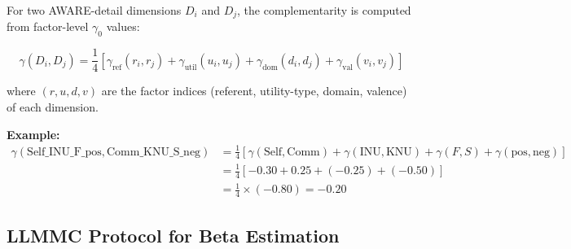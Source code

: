 \begin{tcolorbox}[colback=green!5!white, colframe=green!75!black,
    title=\textbf{EIT-EMP-1-A1: Detail Gamma Computation}]

For two AWARE-detail dimensions $D_i$ and $D_j$, the complementarity is computed from factor-level $\gamma_0$ values:

\begin{equation}
\gamma(D_i, D_j) = \frac{1}{4} \left[ \gamma_{\text{ref}}(r_i, r_j) + \gamma_{\text{util}}(u_i, u_j) + \gamma_{\text{dom}}(d_i, d_j) + \gamma_{\text{val}}(v_i, v_j) \right]
\end{equation}

where $(r, u, d, v)$ are the factor indices (referent, utility-type, domain, valence) of each dimension.

\textbf{Example:}
\begin{align*}
\gamma(\text{Self\_INU\_F\_pos}, \text{Comm\_KNU\_S\_neg}) &= \frac{1}{4} \left[ \gamma(\text{Self}, \text{Comm}) + \gamma(\text{INU}, \text{KNU}) + \gamma(F, S) + \gamma(\text{pos}, \text{neg}) \right] \\
&= \frac{1}{4} \left[ -0.30 + 0.25 + (-0.25) + (-0.50) \right] \\
&= \frac{1}{4} \times (-0.80) = -0.20
\end{align*}

\end{tcolorbox}

\subsection{LLMMC Protocol for Beta Estimation}
\label{subsec:emp1-llmmc}

